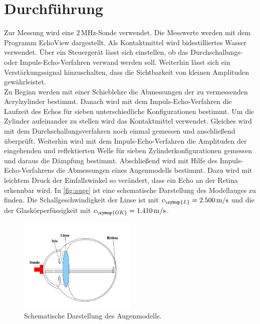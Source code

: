 \section{Durchführung}
\label{sec:Durchfuehrung}
Zur Messung wird eine $2\,\unit{\mega\hertz}$-Sonde verwendet. Die Messwerte werden mit dem Programm EchoView
dargestellt. Als Kontaktmittel wird bidestilliertes Wasser verwendet. Über ein Steuergerät lässt sich einstellen,
ob das Durchschallungs- oder Impuls-Echo-Verfahren verwand werden soll. Weiterhin lässt sich ein
Verstärkungssignal hinzuschalten, dass die Sichtbarkeit von kleinen Amplituden gewährleistet.\\
Zu Beginn werden mit einer Schieblehre die Abmessungen der zu vermessenden Acrylzylinder bestimmt. Danach wird mit
dem Impuls-Echo-Verfahren die Laufzeit des Echos für sieben unterschiedliche Konfigurationen bestimmt. Um die
Zylinder aufeinander zu stellen wird das Kontaktmittel verwendet. Gleiches wird mit dem Durchschallungsverfahren
noch einmal gemessen und anschließend überprüft. Weiterhin wird mit dem Impuls-Echo-Verfahren die
Amplituden der eingehenden und reflektierten Welle für sieben Zylinderkonfigurationen gemessen und daraus die
Dämpfung bestimmt. Abschließend wird mit Hilfe des Impuls-Echo-Verfahrens die Abmessungen eines Augenmodells
bestimmt. Dazu wird mit leichtem Druck der Einfallswinkel so verändert, dass ein Echo an der Retina erkennbar
wird. In \autoref{fig:auge} ist eine schematische Darstellung des Modellauges zu finden. Die
Schallgeschwindigkeit der Linse ist mit $c_{\symup{L}} = 2.500\,\unit{\meter\per\second}$ und die der
Glaskörperfüssigkeit mit $c_{\symup{GK}} = 1.410\,\unit{\meter\per\second}$.

\begin{figure}
    \centering
    \includegraphics[width=0.5\textwidth]{messwerte/Versuchsaufbau.png}
    \caption{Schematische Darstellung des Augenmodells.}
    \label{fig:auge}
\end{figure}